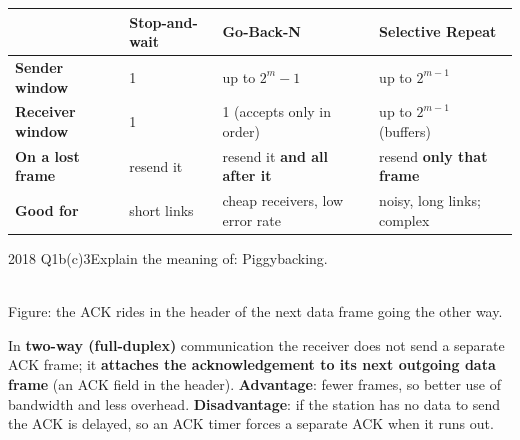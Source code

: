 \documentclass[10pt]{article}
\begin{document}
\begin{center}\small
\begin{tabularx}{\linewidth}{@{}>{\bfseries}p{2.4cm}XXX@{}}
\toprule
 & Stop-and-wait & Go-Back-N & Selective Repeat\\\midrule
Sender window & 1 & up to $2^m - 1$ & up to $2^{m-1}$\\
Receiver window & 1 & 1 (accepts only in order) & up to $2^{m-1}$ (buffers)\\
On a lost frame & resend it & resend it \textbf{and all after it} & resend \textbf{only that frame}\\
Good for & short links & cheap receivers, low error rate & noisy, long links; complex\\
\bottomrule
\end{tabularx}
\end{center}

\begin{pastq}{2018 Q1b(c)}{3}Explain the meaning of: Piggybacking.\end{pastq}
\begin{center}
\\
{\scriptsize\color{midgrey}Figure: the ACK rides in the header of the next data frame going the other way.}
\end{center}
\begin{ans}
In \textbf{two-way (full-duplex)} communication the receiver does not send a separate ACK frame; it \textbf{attaches the acknowledgement to its next outgoing data frame} (an ACK field in the header).
\textbf{Advantage}: fewer frames, so better use of bandwidth and less overhead.
\textbf{Disadvantage}: if the station has no data to send the ACK is delayed, so an ACK timer forces a separate ACK when it runs out.
\end{ans}
\end{document}

